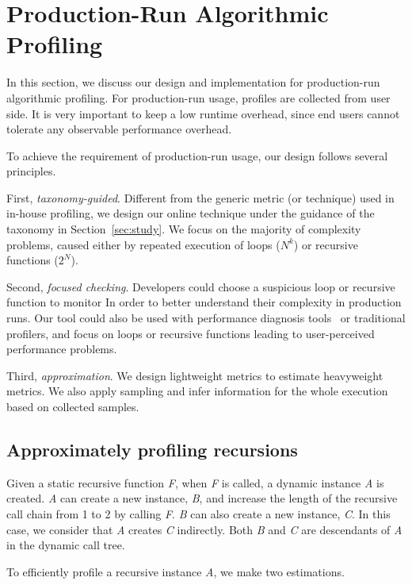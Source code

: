 \section{Production-Run Algorithmic Profiling}
\label{sec:online}

In this section, we discuss our design and 
implementation for production-run algorithmic profiling. 
For production-run usage, profiles are collected from user side.
It is very important to keep a low runtime overhead, since
end users cannot tolerate any observable performance overhead. 

To achieve the requirement of production-run usage,
our design follows several principles. 

First, \textit{taxonomy-guided}. 
Different from the generic metric (or technique) used in in-house profiling,
we design our online technique 
under the guidance of the taxonomy in Section~\ref{sec:study}.
We focus on the majority of complexity problems, 
caused either by repeated execution of loops ($N^k$)
or recursive functions ($2^N$).  

Second, \textit{focused checking}.
Developers could choose a suspicious loop or recursive function to monitor
In order to better understand their complexity in production runs.
Our tool could also be used with performance diagnosis tools~\cite{SongOOPSLA2014} 
or traditional profilers,
and focus on loops or recursive functions leading 
to user-perceived performance problems.

Third, \textit{approximation}. 
We design lightweight metrics to estimate heavyweight metrics.
We also apply sampling and infer information for the whole 
execution based on collected samples.


\subsection{Approximately profiling recursions}

Given a static recursive function \textit{F},
when \textit{F} is called, 
a dynamic instance \textit{A} is created.
\textit{A} can create a new instance, \textit{B}, and increase 
the length of the recursive call chain from 1 to 2 by calling \textit{F}.
\textit{B} can also create a new instance, \textit{C}.
In this case, we consider that \textit{A} creates \textit{C} indirectly.
Both \textit{B} and \textit{C} are descendants of 
\textit{A} in the dynamic call tree. 

To efficiently profile a recursive instance \textit{A}, 
we make two estimations.


